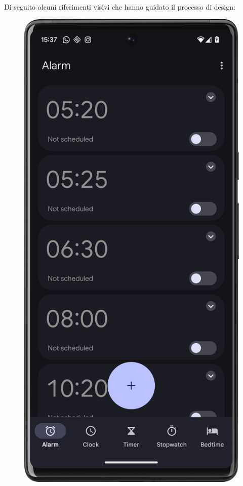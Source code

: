 \documentclass{article}
\begin{document}
\vspace{\baselineskip}

\noindent Di seguito alcuni riferimenti visivi che hanno guidato il processo di
design:

\begin{figure}[H]
    \centering
    \begin{minipage}{0.24\textwidth}
        \centering
        \includegraphics[width=\textwidth]{foto/google_clock_app}

\end{minipage}
\end{figure}
\end{document}
